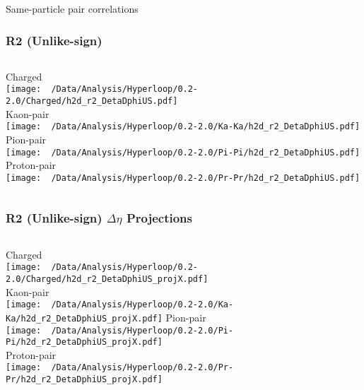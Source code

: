 \documentclass{beamer}
\begin{document}
\begin{frame}
	\Large Same-particle pair correlations
\end{frame}
\begin{frame}
	\frametitle{R2 (Unlike-sign)}
	\begin{columns}
		\centering
		Charged\\
		\texttt{[image: ~/Data/Analysis/Hyperloop/0.2-2.0/Charged/h2d\_r2\_DetaDphiUS.pdf]}\\Kaon-pair\\
		\texttt{[image: ~/Data/Analysis/Hyperloop/0.2-2.0/Ka-Ka/h2d\_r2\_DetaDphiUS.pdf]}
		\centering
		Pion-pair\\
		\texttt{[image: ~/Data/Analysis/Hyperloop/0.2-2.0/Pi-Pi/h2d\_r2\_DetaDphiUS.pdf]}\\Proton-pair\\
		\texttt{[image: ~/Data/Analysis/Hyperloop/0.2-2.0/Pr-Pr/h2d\_r2\_DetaDphiUS.pdf]}
	\end{columns}
\end{frame}
\begin{frame}
	\frametitle{R2 (Unlike-sign) $\Delta\eta$ Projections}
	\begin{columns}
		\column{0.5\textwidth}
		\centering
		Charged\\
		\texttt{[image: ~/Data/Analysis/Hyperloop/0.2-2.0/Charged/h2d\_r2\_DetaDphiUS\_projX.pdf]}\\Kaon-pair\\
		\texttt{[image: ~/Data/Analysis/Hyperloop/0.2-2.0/Ka-Ka/h2d\_r2\_DetaDphiUS\_projX.pdf]}
		\column{0.5\textwidth}
		\centering
		Pion-pair\\
		\texttt{[image: ~/Data/Analysis/Hyperloop/0.2-2.0/Pi-Pi/h2d\_r2\_DetaDphiUS\_projX.pdf]}\\Proton-pair\\
		\texttt{[image: ~/Data/Analysis/Hyperloop/0.2-2.0/Pr-Pr/h2d\_r2\_DetaDphiUS\_projX.pdf]}
	\end{columns}
\end{frame}
\end{document}
